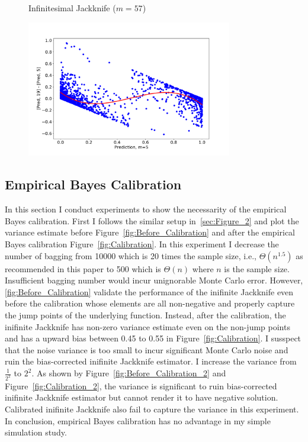 \documentclass[11pt]{article}
\begin{document}
\begin{figure}[htbp]
\begin{minipage}{0.6\textwidth}
	\caption{Infinitesimal Jackknife ($m=57$)}
	\label{fig:figeure4_2}
	\end{minipage}
\end{figure}

\begin{figure}[htbp]
	\label{fig:figure_4_2}
	\centering
	\includegraphics[width=0.8\textwidth]{../figures/figure4(2).pdf}
\end{figure}

\subsection{Empirical Bayes Calibration}
In this section I conduct experiments to show the necessarity of the empirical Bayes calibration.
First I follows the similar setup in~\ref{sec:Figure_2} and plot the variance estimate before Figure~\ref{fig:Before_Calibration} and after the empirical Bayes calibration Figure~\ref{fig:Calibration}.
In this experiment I decrease the number of bagging from 10000 which is 20 times the sample size, i.e., $\Theta(n^{1.5})$ as recommended in this paper to 500 which is $\Theta(n)$ where $n$ is the sample size.
Insufficient bagging number would incur unignorable Monte Carlo error. 
However, \ref{fig:Before_Calibration} validate the performance of the inifinite Jackknife even before the calibration whose elements are all non-negative and properly capture the jump points of the underlying function.
Instead, after the calibration, the inifinite Jackknife has  non-zero variance estimate even on the non-jump points and has a upward bias between 0.45 to 0.55 in Figure~\ref{fig:Calibration}.
I susspect that the noise variance is too small to incur significant Monte Carlo noise and ruin the bias-corrected inifinite Jackknife estimator.
I increase the variance from $\frac{1}{2^2}$ to $2^2$.
As shown by Figure~\ref{fig:Before_Calibration_2} and Figure~\ref{fig:Calibration_2}, the variance is significant to ruin bias-corrected inifinite Jackknife estimator but cannot render it to have negative solution.
Calibrated inifinite Jackknife also fail to capture the variance in this experiment.
In conclusion, empirical Bayes calibration has no advantage in my simple simulation study.
\end{document}
